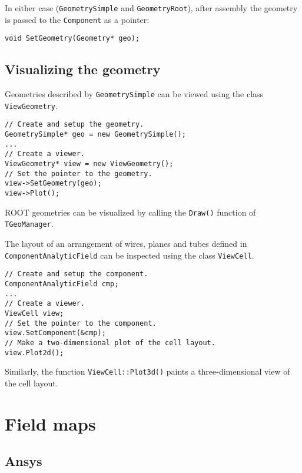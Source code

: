 In either case (\texttt{GeometrySimple} and \texttt{GeometryRoot}),
after assembly the geometry is passed to the \texttt{Component} as a pointer:
\begin{lstlisting}
void SetGeometry(Geometry* geo);
\end{lstlisting}

\subsection{Visualizing the geometry}

Geometries described by \texttt{GeometrySimple} can be viewed 
using the class \texttt{ViewGeometry}. 
\begin{lstlisting}
// Create and setup the geometry.
GeometrySimple* geo = new GeometrySimple();
...
// Create a viewer.
ViewGeometry* view = new ViewGeometry();
// Set the pointer to the geometry.
view->SetGeometry(geo);
view->Plot();
\end{lstlisting}

ROOT geometries can be visualized by calling the \texttt{Draw()} function of
\texttt{TGeoManager}. 

The layout of an arrangement of wires, planes and tubes
defined in \texttt{ComponentAnalyticField} 
can be inspected using the class \texttt{ViewCell}.
\begin{lstlisting}
// Create and setup the component.
ComponentAnalyticField cmp;
... 
// Create a viewer.
ViewCell view;
// Set the pointer to the component.
view.SetComponent(&cmp);
// Make a two-dimensional plot of the cell layout.
view.Plot2d();
\end{lstlisting}
Similarly, the function \texttt{ViewCell::Plot3d()} paints
a three-dimensional view of the cell layout.

\section{Field maps}

\subsection{Ansys}

